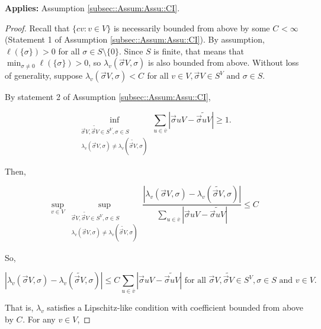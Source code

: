 \documentclass[12pt]{article}
\newcommand{\ov}{\overline}
\newcommand{\te}{\text}
\newcommand{\app}{\textbf{Applies: }}
\newcommand{\ind}{\hspace{24pt}}
\renewcommand{\v}{v}							%
\newcommand{\vv}{u}								%
\renewcommand{\S}{S}							%
\newcommand{\s}{\sigma}							%
\newcommand{\sv}{\vec{\s}}						%
\newcommand{\IGr}{c}							%
\newcommand{\cl}{\ov}							%
\newcommand{\XState}[1]{\S^{#1}}				%
\newcommand{\rate}[1]{\lambda_{#1}}					%
\newcommand{\const}[1]{C_{#1}}						%
\newcommand{\Sm}{\ell}								%
\newcommand{\alt}{\widetilde}						%
\begin{document}
\app Assumption \ref{subsec::Assum:Assu::CI}.

\begin{proof}
Recall that \(\{\IGr{\v}:\v\in V\}\) is necessarily bounded from above by some \(\const{} < \infty\) (Statement 1 of Assumption \ref{subsec::Assum:Assu::CI}). By assumption, \(\Sm(\{\s\}) > 0\) for all \(\s \in \S\setminus \{0\}\). Since \(\S\) is finite, that means that \(\min_{\s \neq 0} \Sm(\{\s\}) > 0\), so \(\rate{\v}(\sv{}{ V},\s)\) is also bounded from above. Without loss of generality, suppose \(\rate{\v}(\sv{}{ V},\s) < \const{}\) for all \(\v\in  V,\sv{}{ V} \in \S^ V\te{ and } \s \in \S\).

\ind By statement 2 of Assumption \ref{subsec::Assum:Assu::CI}, 

\[\inf_{\substack{\sv{}{ V},\alt{\sv{}{ V}} \in \S^ V, \s\in \S\\ \rate{\v}(\sv{}{ V},\s) \neq \rate{\v}(\alt{\sv{}{ V}},\s)}} \sum_{\vv \in \cl{\v}} |\sv{\vv}{ V} - \alt{\sv{\vv}{ V}}| \geq 1.\]

Then,

\[\sup_{\v\in  V} \sup_{\substack{\sv{}{ V},\alt{\sv{}{ V}} \in \S^ V, \s\in \S\\ \rate{\v}(\sv{}{ V},\s) \neq \rate{\v}(\alt{\sv{}{ V}},\s)}} \frac{|\rate{\v}(\sv{}{ V},\s) - \rate{\v}(\alt{\sv{}{ V}},\s)|}{\sum_{\vv \in \cl{\v}} |\sv{\vv}{ V} - \alt{\sv{\vv}{ V}}|} \leq \const{}\]

So,

\[|\rate{\v}(\sv{}{ V},\s) - \rate{\v}(\alt{\sv{}{ V}},\s)|\leq \const{}\sum_{\vv \in \cl{\v}} |\sv{\vv}{ V} - \alt{\sv{\vv}{ V}}| \te{ for all } \sv{}{ V},\alt{\sv{}{ V}}\in \S^ V,\s\in \S\te{ and }\v\in  V.\]

That is, \(\rate{\v}\) satisfies a Lipschitz-like condition with coefficient bounded from above by \(\const{}\). For any \(\v\in  V\),


\end{proof}
\end{document}

